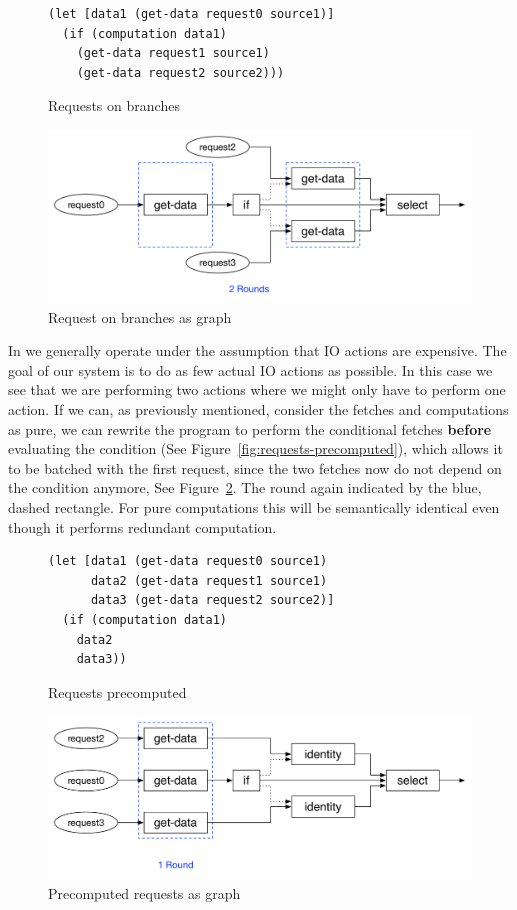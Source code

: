 \begin{figure}
\begin{verbatim}
(let [data1 (get-data request0 source1)]
  (if (computation data1)
    (get-data request1 source1)
    (get-data request2 source2)))
\end{verbatim}
\caption{Requests on branches}
\label{fig:requests-on-branches}
\includegraphics[width=\textwidth]{../Figures/requests-on-branches-graph}
\caption{Request on branches as graph}
\label{fig:requests-on-branches-graph}
\end{figure}

In \yauhau{} we generally operate under the assumption that IO actions are expensive.
The goal of our system is to do as few actual IO actions as possible.
In this case we see that we are performing two actions where we might only have to perform one action.
If we can, as previously mentioned, consider the fetches and computations as pure, we can rewrite the program to perform the conditional fetches \textbf{before} evaluating the condition (See Figure~\ref{fig:requests-precomputed}), which allows it to be batched with the first request, since the two fetches now do not depend on the condition anymore, See Figure~\ref{fig:requests-precomputed-graph}.
The round again indicated by the blue, dashed rectangle.
For pure computations this will be semantically identical even though it performs redundant computation.

\begin{figure}
\begin{verbatim}
(let [data1 (get-data request0 source1)
      data2 (get-data request1 source1)
      data3 (get-data request2 source2)]
  (if (computation data1)
    data2
    data3))
\end{verbatim}
\caption{Requests precomputed}
\label{fig:requests-precomputed}
\includegraphics[width=\textwidth]{../Figures/requests-precomputed-graph}
\caption{Precomputed requests as graph}
\label{fig:requests-precomputed-graph}
\end{figure}

